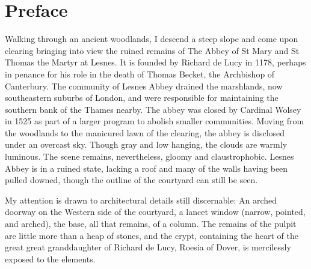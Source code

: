 \chapter*{Preface} %
\label{cha:preface}

Walking through an ancient woodlands, I descend a steep slope and come upon clearing bringing into view the ruined remains of The Abbey of St Mary and St Thomas the Martyr at Lesnes. It is founded by Richard de Lucy in 1178, perhaps in penance for his role in the death of Thomas Becket, the Archbishop of Canterbury. The community of Lesnes Abbey drained the marshlands, now southeastern suburbs of London, and were responsible for maintaining the southern bank of the Thames nearby. The abbey was closed by Cardinal Wolsey in 1525 as part of a larger program to abolish smaller communities. Moving from the woodlands to the manicured lawn of the clearing, the abbey is disclosed under an overcast sky. Though gray and low hanging, the clouds are warmly luminous. The scene remains, nevertheless, gloomy and claustrophobic. Lesnes Abbey is in a ruined state, lacking a roof and many of the walls having been pulled downed, though the outline of the courtyard can still be seen. 

My attention is drawn to architectural details still discernable: An arched doorway on the Western side of the courtyard, a lancet window (narrow, pointed, and arched), the base, all that remains, of a column. The remains of the pulpit are little more than a heap of stones, and the crypt, containing the heart of the great great granddaughter of Richard de Lucy, Roesia of Dover, is mercilessly exposed to the elements.

